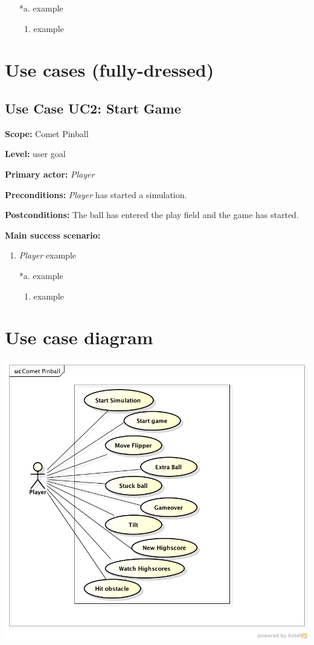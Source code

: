 \documentclass[fontsize=12pt,
               paper=a4,
               twoside=false,
               parskip=half,
               ]{scrartcl}
\begin{document}
\begin{itemize}[leftmargin=3em]
	\item[*a.] example
	\begin{enumerate}
		\item example
	\end{enumerate}
\end{itemize}



\section{Use cases (fully-dressed)}

\subsection{Use Case UC2: Start Game}

\textbf{\textsf{Scope:}} Comet Pinball

\textbf{\textsf{Level:}} user goal

\textbf{\textsf{Primary actor:}} \emph{Player}

\textbf{\textsf{Preconditions:}} \emph{Player} has started a simulation.

\textbf{\textsf{Postconditions:}} The ball has entered the play field and the game has started.

\textbf{\textsf{Main success scenario:}}

\begin{enumerate}[leftmargin=3em]
	\item \emph{Player} example
\end{enumerate}


\begin{itemize}[leftmargin=3em]
	\item[*a.] example
	\begin{enumerate}
		\item example
	\end{enumerate}
\end{itemize}


\section{Use case diagram}


\includegraphics[width=15cm]{./img/usecase-model.png}
\end{document}
